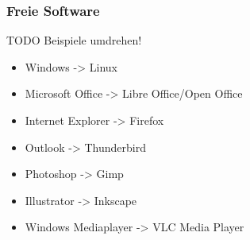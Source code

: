 \documentclass{beamer}
\begin{document}
\begin{frame}
  \frametitle{Freie Software}
  TODO Beispiele umdrehen!
  \begin{itemize}
    \item Windows -> Linux
    \item Microsoft Office -> Libre Office/Open Office
    \item Internet Explorer -> Firefox
    \item Outlook -> Thunderbird
    \item Photoshop -> Gimp
    \item Illustrator -> Inkscape
    \item Windows Mediaplayer -> VLC Media Player
  \end{itemize}
\end{frame}
\end{document}
